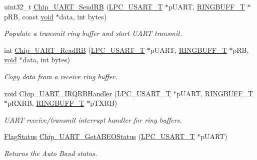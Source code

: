 \begin{DoxyCompactItemize}
uint32\-\_\-t \hyperlink{group__UART__17XX__40XX_ga6ed43ed19b9d2a32ece3e50bc2f651a9}{Chip\-\_\-\-U\-A\-R\-T\-\_\-\-Send\-R\-B} (\hyperlink{structLPC__USART__T}{L\-P\-C\-\_\-\-U\-S\-A\-R\-T\-\_\-\-T} $\ast$p\-U\-A\-R\-T, \hyperlink{structRINGBUFF__T}{R\-I\-N\-G\-B\-U\-F\-F\-\_\-\-T} $\ast$p\-R\-B, const \hyperlink{Paradigm_2Tern__EE_2small_2portmacro_8h_a14d32f8130d3c0b212cfc751730b5b49}{void} $\ast$data, int bytes)
\begin{DoxyCompactList}\small\item\em Populate a transmit ring buffer and start U\-A\-R\-T transmit. \end{DoxyCompactList}\item 
int \hyperlink{group__UART__17XX__40XX_gab54219751466a0fa8d9e75f8689ac99d}{Chip\-\_\-\-U\-A\-R\-T\-\_\-\-Read\-R\-B} (\hyperlink{structLPC__USART__T}{L\-P\-C\-\_\-\-U\-S\-A\-R\-T\-\_\-\-T} $\ast$p\-U\-A\-R\-T, \hyperlink{structRINGBUFF__T}{R\-I\-N\-G\-B\-U\-F\-F\-\_\-\-T} $\ast$p\-R\-B, \hyperlink{Paradigm_2Tern__EE_2small_2portmacro_8h_a14d32f8130d3c0b212cfc751730b5b49}{void} $\ast$data, int bytes)
\begin{DoxyCompactList}\small\item\em Copy data from a receive ring buffer. \end{DoxyCompactList}\item 
\hyperlink{Paradigm_2Tern__EE_2small_2portmacro_8h_a14d32f8130d3c0b212cfc751730b5b49}{void} \hyperlink{group__UART__17XX__40XX_ga8ab537af48951658e60af145690b656e}{Chip\-\_\-\-U\-A\-R\-T\-\_\-\-I\-R\-Q\-R\-B\-Handler} (\hyperlink{structLPC__USART__T}{L\-P\-C\-\_\-\-U\-S\-A\-R\-T\-\_\-\-T} $\ast$p\-U\-A\-R\-T, \hyperlink{structRINGBUFF__T}{R\-I\-N\-G\-B\-U\-F\-F\-\_\-\-T} $\ast$p\-R\-X\-R\-B, \hyperlink{structRINGBUFF__T}{R\-I\-N\-G\-B\-U\-F\-F\-\_\-\-T} $\ast$p\-T\-X\-R\-B)
\begin{DoxyCompactList}\small\item\em U\-A\-R\-T receive/transmit interrupt handler for ring buffers. \end{DoxyCompactList}\item 
\hyperlink{group__LPC__Types__Public__Types_ga89136caac2e14c55151f527ac02daaff}{Flag\-Status} \hyperlink{group__UART__17XX__40XX_ga6d1d74a73290b145868a88e6b5635093}{Chip\-\_\-\-U\-A\-R\-T\-\_\-\-Get\-A\-B\-E\-O\-Status} (\hyperlink{structLPC__USART__T}{L\-P\-C\-\_\-\-U\-S\-A\-R\-T\-\_\-\-T} $\ast$p\-U\-A\-R\-T)
\begin{DoxyCompactList}\small\item\em Returns the Auto Baud status. \end{DoxyCompactList}\item 

\end{DoxyCompactItemize}
